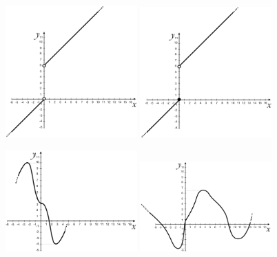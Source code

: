 \begin{itemize}
\begin{figure}[htpb!]
\includegraphics[width=0.45\textwidth]{img/funz_17a.png} \quad
\includegraphics[width=0.45\textwidth]{img/funz_17b.png}   
  
\includegraphics[width=0.45\textwidth]{img/funz_17c.png} \quad
\includegraphics[width=0.45\textwidth]{img/funz_17d.png}
  \end{figure}
  \end{itemize}

\newpage

